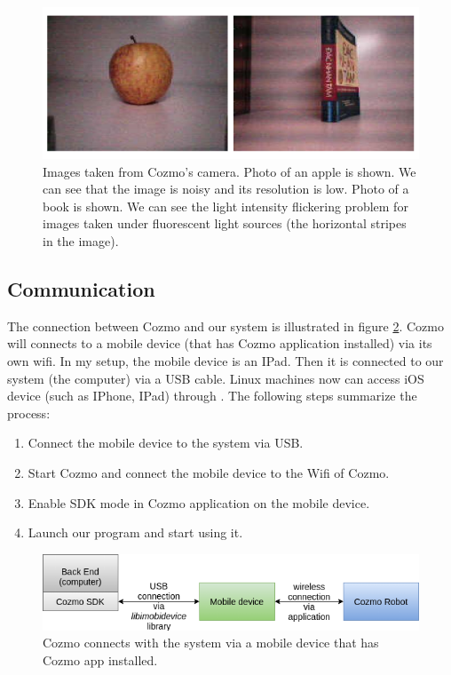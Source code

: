 \begin{figure}[!htb]
	\centering
	\includegraphics[width=1.0\hsize]{./figures/cozmoRealImg}
	\caption{Images taken from Cozmo's camera.  Photo of an apple is shown. We can see that the image is noisy and its resolution is low.  Photo of a book is shown. We can see the light intensity flickering problem for images taken under fluorescent light sources (the horizontal stripes in the image).}
	\label{fig:cozmoRealImg}
\end{figure}


 \subsection{Communication}
The connection between Cozmo and our system is illustrated in figure \ref{fig:CozmoConnect}. Cozmo will connects to a mobile device (that has Cozmo application installed) via its own wifi. In my setup, the mobile device is an IPad. Then it is connected to our system (the computer) via a USB cable. Linux machines now can access iOS device (such as IPhone, IPad) through  \cite{libimobiledevice}. The following steps summarize the process:
\begin{enumerate}
	\item Connect the mobile device to the system via USB.
	\item Start Cozmo and connect the mobile device to the Wifi of Cozmo.
	\item Enable SDK mode in Cozmo application on the mobile device.
	\item Launch our program and start using it.
\end{enumerate}
\begin{figure}[!htb]
	\centering
	\includegraphics[width=0.9\hsize]{./figures/CozmoConnect}
	\caption{Cozmo connects with the system via a mobile device that has Cozmo app installed.}
	\label{fig:CozmoConnect}
\end{figure}


